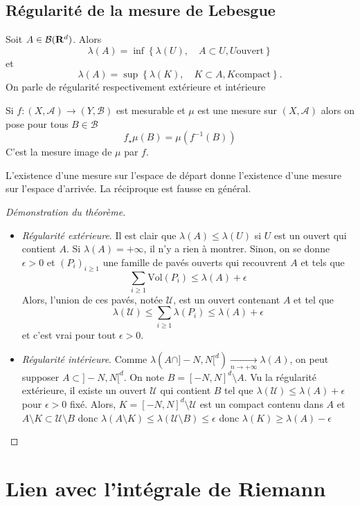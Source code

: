 \subsection{Régularité de la mesure de Lebesgue}

\begin{thm}
    Soit $A \in  \mathcal  B(\mathbf R^d)$. Alors \[
        \lambda(A)=\inf \left\{ \lambda(U), \quad  A\subset U, U \text{ouvert} \right\} 
    \]
    et \[
        \lambda(A)= \sup \left\{ \lambda(K), \quad  K\subset A, K\text{compact} \right\}.
    \]
    On parle de régularité respectivement extérieure et intérieure
\end{thm}

\begin{dfn}
    Si $f:(X, \mathcal  A)\longrightarrow (Y, \mathcal  B)$ est mesurable et $\mu$ est une mesure sur  $(X, \mathcal  A)$ alors on pose pour tous $B \in  \mathcal  B$ \[
        f_\star \mu(B)=\mu(f^{-1} (B))
    \]
    C'est la mesure image de $\mu$ par  $f$.
\end{dfn}

\begin{rem}
L'existence d'une mesure sur l'espace de départ donne l'existence d'une mesure sur l'espace d'arrivée. La réciproque est fausse en général.
\end{rem}

\begin{proof}[Démonstration du théorème]
~
\begin{itemize}
    \item \emph{Régularité extérieure}. Il est clair que $\lambda(A)\leq \lambda(U)$ si $U$ est un ouvert qui contient  $A$. Si $\lambda(A)=+\infty$, il n'y a rien à montrer. Sinon, on se donne  $ \epsilon>0$ et $(P_i)_{i\geq 1}$ une famille de pavés ouverts qui recouvrent $A$ et tels que  \[
            \sum_{i\geq 1} \mathrm{Vol}(P_i) \leq \lambda(A)+\epsilon
    \] 
    Alors, l'union de ces pavés, notée $\mathcal  U$, est un ouvert contenant $A$ et tel que  \[
        \lambda(\mathcal  U)\leq \sum_{i\geq 1}\lambda(P_i)\leq \lambda(A)+\epsilon
    \] 
    et c'est vrai pour tout $ \epsilon>0$.
\item \emph{Régularité intérieure}. Comme $\lambda(A\cap ]-N, N[^d) \xrightarrow[n\to+\infty]{}\lambda(A)$, on peut supposer $A\subset ]-N, N[^d$. On note  $B=[-N, N]^d \setminus  A$. Vu la régularité extérieure, il existe un ouvert $\mathcal  U$ qui contient $B$ tel que  $\lambda(\mathcal  U)\leq \lambda(A)+\epsilon$ pour $\epsilon>0$ fixé. Alors, $K=[-N, N]^d \setminus  \mathcal  U$ est un compact contenu dans $A$ et  $A \setminus  K\subset \mathcal U \setminus  B$ donc $\lambda (A \setminus  K)\leq  \lambda (\mathcal  U \setminus  B)\leq  \epsilon$ donc $\lambda(K)\geq \lambda(A)-\epsilon$
\end{itemize}
\end{proof}

\section{Lien avec l'intégrale de Riemann}


